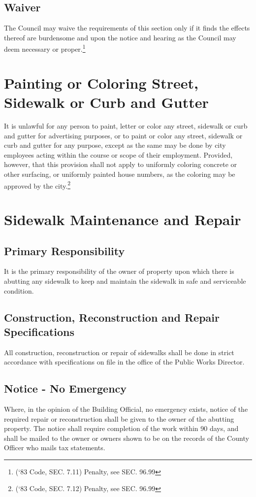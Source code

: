 \subsection{Waiver}
The Council may waive the requirements of this section only if it finds the effects thereof are burdensome and upon the notice and hearing as the Council may deem necessary or proper.\footnote{(‘83 Code, SEC. 7.11)  Penalty, see SEC. 96.99}
\section{Painting or Coloring Street, Sidewalk or Curb and Gutter}
It is unlawful for any person to paint, letter or color any street, sidewalk or curb and gutter for advertising purposes, or to paint or color any street, sidewalk or curb and gutter for any purpose, except as the same may be done by city employees acting within the course or scope of their employment. Provided, however, that this provision shall not apply to uniformly coloring concrete or other surfacing, or uniformly painted house numbers, as the coloring may be approved by the city.\footnote{(‘83 Code, SEC. 7.12)  Penalty, see SEC. 96.99}
\section{Sidewalk Maintenance and Repair}
\subsection{Primary Responsibility}
It is the primary responsibility of the owner of property upon which there is abutting any sidewalk to keep and maintain the sidewalk in safe and serviceable condition.
\subsection{Construction, Reconstruction and Repair Specifications}
All construction, reconstruction or repair of sidewalks shall be done in strict accordance with specifications on file in the office of the Public Works Director.
\subsection{Notice - No Emergency}
Where, in the opinion of the Building Official, no emergency exists, notice of the required repair or reconstruction shall be given to the owner of the abutting property.  The notice shall require completion of the work within 90 days, and shall be mailed to the owner or owners shown to be on the records of the County Officer who mails tax statements.
